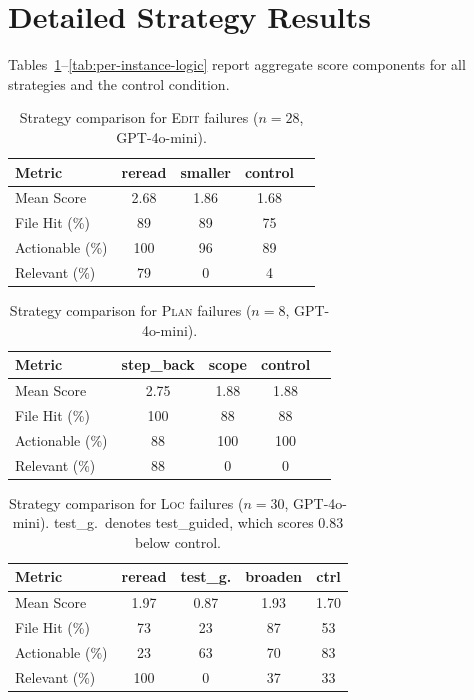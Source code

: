 \documentclass{article}
\begin{document}
\section{Detailed Strategy Results}
\label{app:per-instance}

Tables~\ref{tab:per-instance-edit}--\ref{tab:per-instance-logic} report aggregate
score components for all strategies and the control condition.

\begin{table}[H]
\centering
\small
\begin{tabular}{@{}lcccc@{}}
\toprule
\textbf{Metric} & \textbf{reread} & \textbf{smaller} & \textbf{control} \\
\midrule
Mean Score & 2.68 & 1.86 & 1.68 \\
File Hit (\%) & 89 & 89 & 75 \\
Actionable (\%) & 100 & 96 & 89 \\
Relevant (\%) & 79 & 0 & 4 \\
\bottomrule
\end{tabular}
\caption{Strategy comparison for \textsc{Edit} failures ($n=28$, GPT-4o-mini).}
\label{tab:per-instance-edit}
\end{table}

\begin{table}[H]
\centering
\small
\begin{tabular}{@{}lcccc@{}}
\toprule
\textbf{Metric} & \textbf{step\_back} & \textbf{scope} & \textbf{control} \\
\midrule
Mean Score & 2.75 & 1.88 & 1.88 \\
File Hit (\%) & 100 & 88 & 88 \\
Actionable (\%) & 88 & 100 & 100 \\
Relevant (\%) & 88 & 0 & 0 \\
\bottomrule
\end{tabular}
\caption{Strategy comparison for \textsc{Plan} failures ($n=8$, GPT-4o-mini).}
\label{tab:per-instance-plan}
\end{table}

\begin{table}[H]
\centering
\small
\setlength{\tabcolsep}{3pt}
\begin{tabular}{@{}lcccc@{}}
\toprule
\textbf{Metric} & \textbf{reread} & \textbf{test\_g.} & \textbf{broaden} & \textbf{ctrl} \\
\midrule
Mean Score & 1.97 & 0.87 & 1.93 & 1.70 \\
File Hit (\%) & 73 & 23 & 87 & 53 \\
Actionable (\%) & 23 & 63 & 70 & 83 \\
Relevant (\%) & 100 & 0 & 37 & 33 \\
\bottomrule
\end{tabular}
\caption{Strategy comparison for \textsc{Loc} failures ($n=30$, GPT-4o-mini).
test\_g.\ denotes test\_guided, which scores 0.83 below control.}
\label{tab:per-instance-loc}
\end{table}
\end{document}
